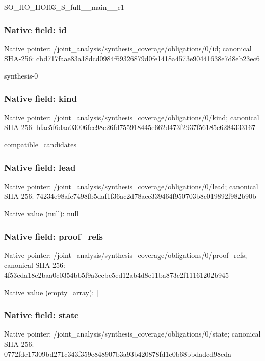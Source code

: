 \documentclass[10pt,a4paper]{article}
\begin{document}
\begingroup\raggedright\sloppy SO\_\allowbreak{}HO\_\allowbreak{}HOI03\_\allowbreak{}S\_\allowbreak{}full\_\allowbreak{}\_\allowbreak{}main\_\allowbreak{}\_\allowbreak{}c1\par\endgroup

\subsubsection{Native field: id}
Native pointer: /joint\_\allowbreak{}analysis/synthesis\_\allowbreak{}coverage/obligations/0/id; canonical SHA-256: cbd717faae83a18dcd0984f69326879d0fe1418a4573e90441638e7d8eb23ec6

\begingroup\raggedright\sloppy synthesis-0\par\endgroup

\subsubsection{Native field: kind}
Native pointer: /joint\_\allowbreak{}analysis/synthesis\_\allowbreak{}coverage/obligations/0/kind; canonical SHA-256: bfae5f6daa03006fec98e26fd755918445e662d473f2937f56185e6284333167

\begingroup\raggedright\sloppy compatible\_\allowbreak{}candidates\par\endgroup

\subsubsection{Native field: lead}
Native pointer: /joint\_\allowbreak{}analysis/synthesis\_\allowbreak{}coverage/obligations/0/lead; canonical SHA-256: 74234e98afe7498fb5daf1f36ac2d78acc339464f950703b8c019892f982b90b

Native value (null): null

\subsubsection{Native field: proof\_\allowbreak{}refs}
Native pointer: /joint\_\allowbreak{}analysis/synthesis\_\allowbreak{}coverage/obligations/0/proof\_\allowbreak{}refs; canonical SHA-256: 4f53cda18c2baa0c0354bb5f9a3ecbe5ed12ab4d8e11ba873c2f11161202b945

Native value (empty\_\allowbreak{}array): []

\subsubsection{Native field: state}
Native pointer: /joint\_\allowbreak{}analysis/synthesis\_\allowbreak{}coverage/obligations/0/state; canonical SHA-256: 0772fde17309bd271c343f359e848907b3a93b420878fd1e0b68bbdadcd98eda
\end{document}
